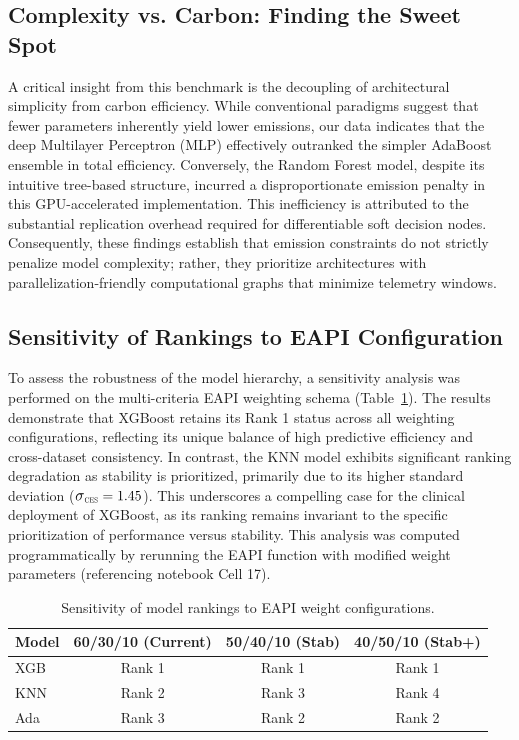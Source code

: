 \documentclass[conference]{IEEEtran}
\newcommand{\sigmaCES}{\scalebox{1.1}{$\sigma$}_{\scalebox{0.5}{CES}}}
\begin{document}
\subsection{Complexity vs. Carbon: Finding the Sweet Spot}
A critical insight from this benchmark is the decoupling of architectural simplicity from carbon efficiency. While conventional paradigms suggest that fewer parameters inherently yield lower emissions, our data indicates that the deep Multilayer Perceptron (MLP) effectively outranked the simpler AdaBoost ensemble in total efficiency. Conversely, the Random Forest model, despite its intuitive tree-based structure, incurred a disproportionate emission penalty in this GPU-accelerated implementation. This inefficiency is attributed to the substantial replication overhead required for differentiable soft decision nodes. Consequently, these findings establish that emission constraints do not strictly penalize model complexity; rather, they prioritize architectures with parallelization-friendly computational graphs that minimize telemetry windows.

\subsection{Sensitivity of Rankings to EAPI Configuration}
To assess the robustness of the model hierarchy, a sensitivity analysis was performed on the multi-criteria EAPI weighting schema (Table~\ref{tab:sensitivity}). The results demonstrate that XGBoost retains its Rank 1 status across all weighting configurations, reflecting its unique balance of high predictive efficiency and cross-dataset consistency. In contrast, the KNN model exhibits significant ranking degradation as stability is prioritized, primarily due to its higher standard deviation ($\sigmaCES = 1.45$). This underscores a compelling case for the clinical deployment of XGBoost, as its ranking remains invariant to the specific prioritization of performance versus stability. This analysis was computed programmatically by rerunning the EAPI function with modified weight parameters (referencing notebook Cell 17).

\begin{table}[t!]
\centering
\caption{Sensitivity of model rankings to EAPI weight configurations.}
\label{tab:sensitivity}
\footnotesize
\setlength{\tabcolsep}{3pt}
\begin{tabular}{lccc}
\toprule
\textbf{Model} & \textbf{60/30/10 (Current)} & \textbf{50/40/10 (Stab)} & \textbf{40/50/10 (Stab+)} \\
\midrule
XGB & Rank 1 & Rank 1 & Rank 1 \\
KNN & Rank 2 & Rank 3 & Rank 4 \\
Ada & Rank 3 & Rank 2 & Rank 2 \\
\bottomrule
\end{tabular}
\end{table}
\end{document}
